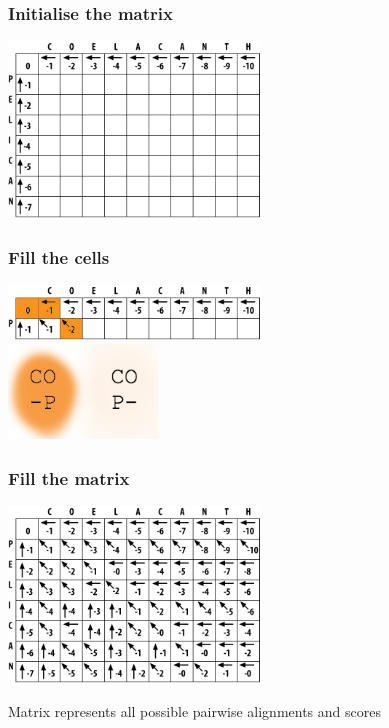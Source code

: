 \documentclass[table]{beamer}
\begin{document}
    \begin{frame}
     \frametitle{Initialise the matrix}
       \begin{center}
         \includegraphics[width=0.5\textwidth]{images/initialise}
       \end{center}
    \end{frame}   
   
    \begin{frame}
     \frametitle{Fill the cells}
       \begin{center}
         \includegraphics[width=0.5\textwidth]{images/fill_start} \\
         \includegraphics[width=0.3\textwidth]{images/fill_start_letters}
       \end{center}
    \end{frame}     

    \begin{frame}
     \frametitle{Fill the matrix}
       \begin{center}
         \includegraphics[width=0.5\textwidth]{images/full_matrix}
       \end{center}
       Matrix represents all possible pairwise alignments and scores
    \end{frame}  
   
\end{document}
